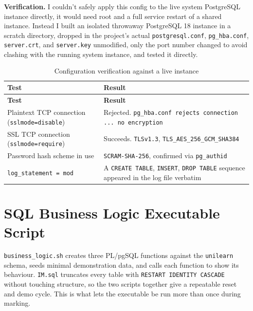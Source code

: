 \documentclass[12pt,a4paper]{article}
\begin{document}
\noindent\textbf{Verification.} I couldn't safely apply this config to the live system PostgreSQL instance directly, it would need root and a full service restart of a shared instance. Instead I built an isolated throwaway PostgreSQL 18 instance in a scratch directory, dropped in the project's actual \lstinline|postgresql.conf|, \lstinline|pg_hba.conf|, \lstinline|server.crt|, and \lstinline|server.key| unmodified, only the port number changed to avoid clashing with the running system instance, and tested it directly.

\footnotesize
\renewcommand{\arraystretch}{1.3}
\begin{longtable}{@{} >{\raggedright\arraybackslash}p{5.5cm} >{\raggedright\arraybackslash}p{9.5cm} @{}}
\caption{Configuration verification against a live instance}\\
\toprule
\textbf{Test} & \textbf{Result} \\
\midrule
\endfirsthead

\toprule
\textbf{Test} & \textbf{Result} \\
\midrule
\endhead

\bottomrule
\endfoot

Plaintext TCP connection (\lstinline|sslmode=disable|) & Rejected. \lstinline|pg_hba.conf rejects connection ... no encryption| \\[0.4em]
SSL TCP connection (\lstinline|sslmode=require|) & Succeeds. \lstinline|TLSv1.3|, \lstinline|TLS_AES_256_GCM_SHA384| \\[0.4em]
Password hash scheme in use & \lstinline|SCRAM-SHA-256|, confirmed via \lstinline|pg_authid| \\[0.4em]
\lstinline|log_statement = mod| & A \lstinline|CREATE TABLE|, \lstinline|INSERT|, \lstinline|DROP TABLE| sequence appeared in the log file verbatim \\

\end{longtable}
\renewcommand{\arraystretch}{1.0}
\normalsize

\newpage
\section{SQL Business Logic Executable Script}
\label{sec:task3}

\lstinline|business_logic.sh| creates three PL/pgSQL functions against the \lstinline|unilearn| schema, seeds minimal demonstration data, and calls each function to show its behaviour. \lstinline|IM.sql| truncates every table with \lstinline|RESTART IDENTITY CASCADE| without touching structure, so the two scripts together give a repeatable reset and demo cycle. This is what lets the executable be run more than once during marking.
\end{document}
